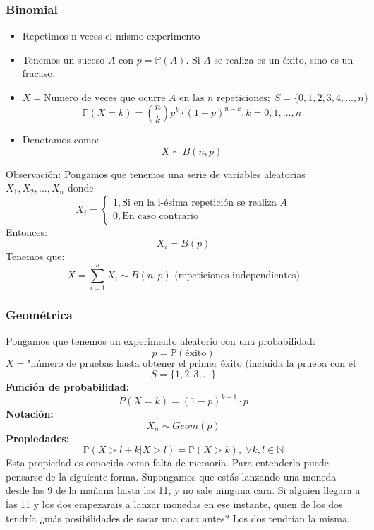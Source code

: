 \documentclass[11pt]{article}
\newcommand{\N}{\mathbb{N}}
\newcommand{\prob}{\mathbb{P}}
\theoremstyle{plain}
\begin{document}
            \subsubsection{Binomial} %
            \label{subsub:binomial}
            \begin{itemize}
                \item Repetimos n veces el mismo experimento
                \item Tenemos un suceso $A$ con $p=\prob(A)$. Si $A$ se realiza es un éxito, sino es un fracaso.
                \item \[X = \text{Numero de veces que ocurre $A$ en las $n$ repeticiones}; \; S = \{0,1,2,3,4,...,n\}\]
                \[\prob(X=k) = \binom{n}{k} p^k \cdot (1-p)^{n-k}, k=0,1,...,n\]
                \item Denotamos como:
                \[X\sim B(n,p)\]
            \end{itemize}
            \underline{Observación:} Pongamos que tenemos una serie de variables aleatorias $X_1,X_2,...,X_n$ donde
            \begin{equation}
                X_i = 
                \begin{cases}
                    1, \text{Si en la i-ésima repetición se realiza $A$}\\
                    0, \text{En caso contrario}
                \end{cases}
            \end{equation}
            Entonces:
            \[X_i = B(p)\]
            Tenemos que:
            \[X = \sum_{i=1}^n X_i \sim B(n,p) \text{ (repeticiones independientes)}\]
            \subsubsection{Geométrica} %
            \label{subsub:geometrica}
                Pongamos que tenemos un experimento aleatorio con una probabilidad:
                \[p = \prob(\text{éxito})\]
                \[X = \text{"número de pruebas hasta obtener el primer éxito (incluida la prueba con el éxito)"}\]
                \[S = \{1,2,3,...\}\]
                \textbf{Función de probabilidad:}
                \[P(X=k) = (1-p)^{k-1} \cdot p\]
                \textbf{Notación:} \[X_n \sim Geom(p)\]
                \textbf{Propiedades:}
                \[\prob(X>l+k | X>l) = \prob(X>k), \; \forall k,l\in\N \]
                Esta propiedad es conocida como falta de memoria. Para entenderlo puede pensarse de la siguiente forma. Supongamos que estás lanzando una moneda desde las 9 de la mañana hasta las 11, y no sale ninguna cara. Si alguien llegara a ĺas 11 y los dos empezarais a lanzar monedas en ese instante, quien de los dos tendría ¿más posibilidades de sacar una cara antes? Los dos tendrían la misma.
\end{document}
